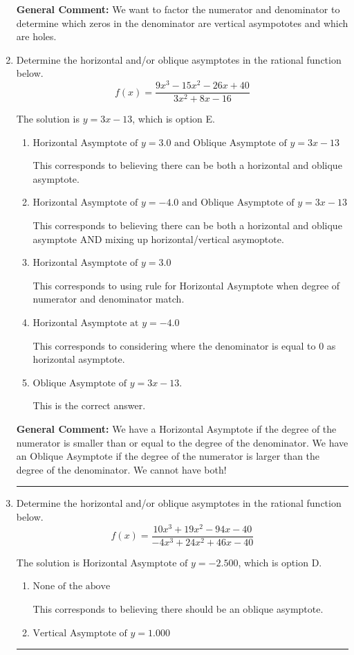 \documentclass{extbook}[14pt]
\newcommand{\litem}[1]{\item #1

\rule{\textwidth}{0.4pt}}
\begin{document}
\begin{enumerate}
{\textbf{General Comment:} We want to factor the numerator and denominator to determine which zeros in the denominator are vertical asympototes and which are holes.
}
\litem{
Determine the horizontal and/or oblique asymptotes in the rational function below.
\[ f(x) = \frac{9x^{3} -15 x^{2} -26 x + 40}{3x^{2} +8 x -16} \]

The solution is \( y = 3x -13 \), which is option E.\begin{enumerate}[label=\Alph*.]
\item \( \text{Horizontal Asymptote of } y = 3.0 \text{ and Oblique Asymptote of } y = 3x -13 \)

This corresponds to believing there can be both a horizontal and oblique asymptote.
\item \( \text{Horizontal Asymptote of } y = -4.0 \text{ and Oblique Asymptote of } y = 3x -13 \)

This corresponds to believing there can be both a horizontal and oblique asymptote AND mixing up horizontal/vertical asymoptote.
\item \( \text{Horizontal Asymptote of } y = 3.0  \)

This corresponds to using rule for Horizontal Asymptote when degree of numerator and denominator match.
\item \( \text{Horizontal Asymptote at } y = -4.0 \)

This corresponds to considering where the denominator is equal to 0 as horizontal asymptote.
\item \( \text{Oblique Asymptote of } y = 3x -13. \)

This is the correct answer.
\end{enumerate}

\textbf{General Comment:} We have a Horizontal Asymptote if the degree of the numerator is smaller than or equal to the degree of the denominator. We have an Oblique Asymptote if the degree of the numerator is larger than the degree of the denominator. We cannot have both!
}
\litem{
Determine the horizontal and/or oblique asymptotes in the rational function below.
\[ f(x) = \frac{10x^{3} +19 x^{2} -94 x -40}{-4x^{3} +24 x^{2} +46 x -40} \]

The solution is \( \text{Horizontal Asymptote of } y = -2.500  \), which is option D.\begin{enumerate}[label=\Alph*.]
\item \( \text{None of the above} \)

This corresponds to believing there should be an oblique asymptote.
\item \( \text{Vertical Asymptote of } y = 1.000  \)


\end{enumerate}}
\end{enumerate}
\end{document}

